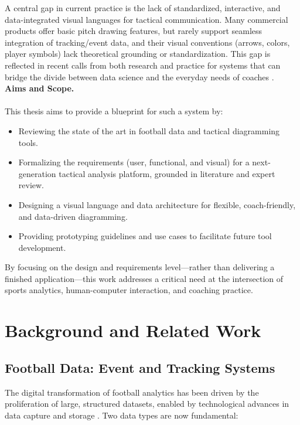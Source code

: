 \documentclass[11pt,a4paper,openright]{report}
\begin{document}
A central gap in current practice is the lack of standardized, interactive, and data-integrated visual languages for tactical communication. Many commercial products offer basic pitch drawing features, but rarely support seamless integration of tracking/event data, and their visual conventions (arrows, colors, player symbols) lack theoretical grounding or standardization. This gap is reflected in recent calls from both research and practice for systems that can bridge the divide between data science and the everyday needs of coaches \cite{maiden2023designing, perin2013soccerstories}.\\


\textbf{Aims and Scope.}  
\\\\
This thesis aims to provide a blueprint for such a system by:
\begin{itemize}
    \item Reviewing the state of the art in football data and tactical diagramming tools.
    \item Formalizing the requirements (user, functional, and visual) for a next-generation tactical analysis platform, grounded in literature and expert review.
    \item Designing a visual language and data architecture for flexible, coach-friendly, and data-driven diagramming.
    \item Providing prototyping guidelines and use cases to facilitate future tool development.
\end{itemize}
By focusing on the design and requirements level—rather than delivering a finished application—this work addresses a critical need at the intersection of sports analytics, human-computer interaction, and coaching practice.

\chapter{Background and Related Work}
\label{chap:context}

\section*{Football Data: Event and Tracking Systems}
The digital transformation of football analytics has been driven by the proliferation of large, structured datasets, enabled by technological advances in data capture and storage \cite{morgulev2018sports}. Two data types are now fundamental:
\end{document}
